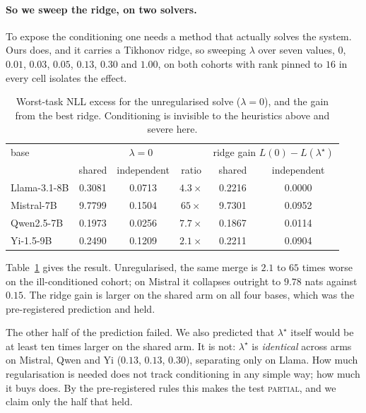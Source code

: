 \paragraph{So we sweep the ridge, on two solvers.} To expose the
conditioning one needs a method that actually solves the system. Ours
does, and it carries a Tikhonov ridge, so sweeping $\lambda$ over seven
values, $0$, $0.01$, $0.03$, $0.05$, $0.13$, $0.30$ and $1.00$, on both
cohorts with rank pinned to $16$ in every cell isolates the effect.

\begin{table}[t]
\centering
\small
\caption{Worst-task NLL excess for the unregularised solve
($\lambda = 0$), and the gain from the best ridge. Conditioning is
invisible to the heuristics above and severe here.}
\label{tab:ridge}
\begin{tabular}{lccccc}
\toprule
base & \multicolumn{3}{c}{$\lambda = 0$} &
\multicolumn{2}{c}{ridge gain $L(0) - L(\lambda^\star)$} \\
 & shared & independent & ratio & shared & independent \\
\midrule
Llama-3.1-8B & 0.3081 & 0.0713 & $4.3\times$  & 0.2216 & 0.0000 \\
Mistral-7B   & 9.7799 & 0.1504 & $65\times$   & 9.7301 & 0.0952 \\
Qwen2.5-7B   & 0.1973 & 0.0256 & $7.7\times$  & 0.1867 & 0.0114 \\
Yi-1.5-9B    & 0.2490 & 0.1209 & $2.1\times$  & 0.2211 & 0.0904 \\
\bottomrule
\end{tabular}
\end{table}

Table~\ref{tab:ridge} gives the result. Unregularised, the same merge is
$2.1$ to $65$ times worse on the ill-conditioned cohort; on Mistral it
collapses outright to $9.78$ nats against $0.15$. The ridge gain is larger
on the shared arm on all four bases, which was the pre-registered
prediction and held.

The other half of the prediction failed. We also predicted that $\lambda^\star$ itself would be at least ten times
larger on the shared arm. It is not: $\lambda^\star$ is \emph{identical}
across arms on Mistral, Qwen and Yi ($0.13$, $0.13$, $0.30$), separating
only on Llama. How much regularisation is needed does not track
conditioning in any simple way; how much it buys does. By the
pre-registered rules this makes the test \textsc{partial}, and we claim
only the half that held.

